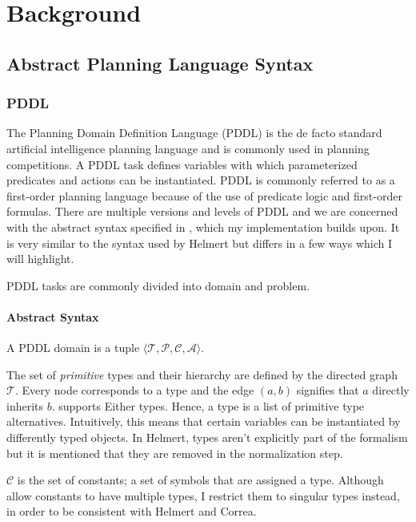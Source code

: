 
\chapter{Background}
\section{Abstract Planning Language Syntax}

\subsection{PDDL}
The Planning Domain Definition Language (PDDL) is the de facto standard artificial intelligence planning language and is commonly used in planning competitions.
A PDDL task defines variables with which parameterized predicates and actions can be instantiated. PDDL is commonly referred to as a first-order planning language because of the use of predicate logic and first-order formulas.
There are multiple versions and levels of PDDL and we are concerned with the abstract syntax specified in \cite{AbLa}, which my implementation builds upon.
It is very similar to the syntax used by Helmert but differs in a few ways which I will highlight.

PDDL tasks are commonly divided into domain and problem.

\subsubsection{Abstract Syntax}
A PDDL domain is a tuple $\langle\mathcal T, \mathcal P, \mathcal C, \mathcal A\rangle$.

The set of \textit{primitive} types and their hierarchy are defined by the directed graph $\mathcal T$. Every node corresponds to a type and the edge $(a, b)$ signifies that $a$ directly inherits $b$.
\cite{AbLa} supports Either types. Hence, a type is a list of primitive type alternatives. Intuitively, this means that certain variables can be instantiated by differently typed objects. In Helmert, types aren't explicitly part of the formalism but it is mentioned that they are removed in the normalization step.

$\mathcal C$ is the set of constants; a set of symbols that are assigned a type. Although \cite{AbLa} allow constants to have multiple types, I restrict them to singular types instead, in order to be consistent with Helmert and Correa.

